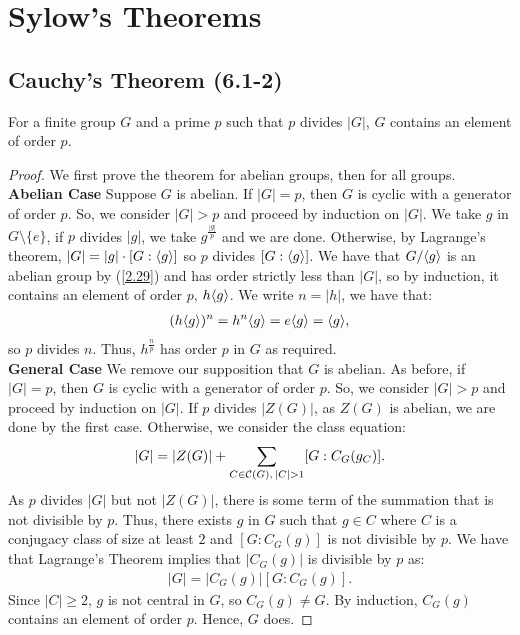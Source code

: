 \section{Sylow's Theorems}

\subsection{Cauchy's Theorem (6.1-2)} \label{6.1} \label{6.2}

For a finite group $G$ and a prime $p$ such that $p$ divides $|G|$,
$G$ contains an element of order $p$.

\begin{proof}
    We first prove the theorem for abelian groups, then for all groups.
    \\[\baselineskip]
    \textbf{Abelian Case} 
    Suppose $G$ is abelian.
    If $|G| = p$, then $G$ is cyclic with a generator of order $p$.
    So, we consider $|G| > p$ and proceed by induction on $|G|$. 
    We take $g$ in $G \setminus \{e\}$, if $p$ divides $|g|$, 
    we take $g^{\frac{|g|}{p}}$ and we are done.
    Otherwise, by Lagrange's theorem, $|G| = |g| \cdot [G : {\langle g \rangle}]$
    so $p$ divides $[G : {\langle g \rangle}]$. We have that $G / {\langle g \rangle}$ is an abelian
    group by (\ref{2.29}) and has order strictly less than $|G|$, so by induction, 
    it contains an element of order $p$, $h{\langle g \rangle}$.
    We write $n = |h|$, we have that: \begin{align*}
        (h{\langle g \rangle})^n = h^n{\langle g \rangle} = e{\langle g \rangle} = {\langle g \rangle},
    \end{align*} so $p$ divides $n$. Thus, $h^{\frac{n}{p}}$ has order
    $p$ in $G$ as required.
    \\[\baselineskip]
    \textbf{General Case} We remove our supposition that $G$ is abelian.
    As before, if $|G| = p$, then $G$ is cyclic with a generator of 
    order $p$. So, we consider $|G| > p$ and proceed by induction on $|G|$.
    If $p$ divides $|Z(G)|$, as $Z(G)$ is abelian, we are done by the first case. 
    Otherwise, we consider the class equation: \begin{align*}
        |G| = |Z(G)| + \sum_{C \in \mathcal{C}(G), \, |C| > 1} [G : C_G(g_C)].
    \end{align*} As $p$ divides $|G|$ but not $|Z(G)|$, there is some
    term of the summation that is not divisible by $p$. Thus, there exists
    $g$ in $G$ such that $g \in C$ where $C$ is a conjugacy class
    of size at least $2$ and $[G : C_G(g)]$ is not divisible by $p$.
    We have that Lagrange's Theorem implies that $|C_G(g)|$ is divisible
    by $p$ as: \begin{align*}
        |G| = |C_G(g)|[G : C_G(g)].
    \end{align*} Since $|C| \geq 2$, $g$ is not central in $G$, so
    $C_G(g) \neq G$. By induction, $C_G(g)$ contains an element of
    order $p$. Hence, $G$ does.
\end{proof}

